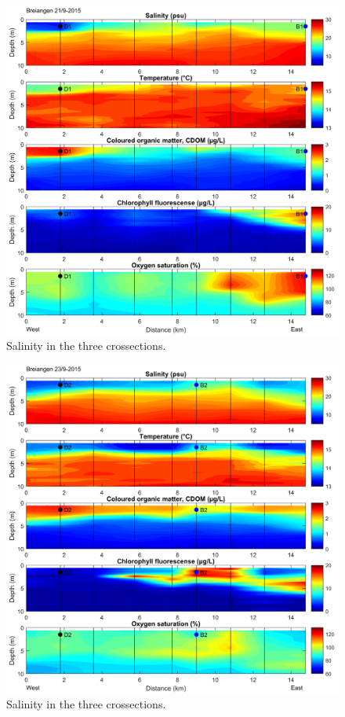 \documentclass[12pt,a4paper,english]{article}
\begin{document}
\begin{figure}[ht]
\centerline{
\includegraphics*[width=\textwidth]{Figurer/Breiangen_21_09_2015_v2.png}}
\caption{\small
Salinity in the three crossections.}
\label{fig:brei1}
\end{figure}

\begin{figure}[ht]
\centerline{
\includegraphics*[width=\textwidth]{Figurer/Breiangen_23_09_2015_v2.png}}
\caption{\small
Salinity in the three crossections.}
\label{fig:brei2}
\end{figure}
\end{document}
